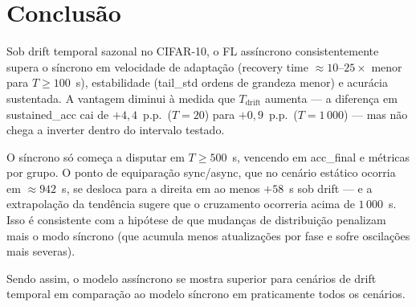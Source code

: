 \documentclass[12pt, a4paper]{article}
\begin{document}
\section{Conclusão}

Sob drift temporal sazonal no CIFAR-10, o FL assíncrono consistentemente
supera o síncrono em velocidade de adaptação (recovery time $\approx
10$--$25{\times}$ menor para $T \geq 100$~s), estabilidade (tail\_std ordens
de grandeza menor) e acurácia sustentada. A vantagem diminui à medida que
$T_{\text{drift}}$ aumenta --- a diferença em sustained\_acc cai de
$+4{,}4$~p.p.\ ($T = 20$) para $+0{,}9$~p.p.\ ($T = 1\,000$) --- mas não
chega a inverter dentro do intervalo testado.

O síncrono só começa a disputar em $T \geq 500$~s, vencendo em acc\_final e
métricas por grupo. O ponto de equiparação sync/async, que no cenário estático
ocorria em $\approx 942$~s, se desloca para a direita em ao menos $+58$~s
sob drift --- e a extrapolação da tendência sugere que o cruzamento ocorreria
acima de $1\,000$~s. Isso é consistente com a hipótese de que
mudanças de distribuição penalizam mais o modo síncrono (que acumula menos
atualizações por fase e sofre oscilações mais severas).

Sendo assim, o modelo assíncrono se mostra superior para cenários de drift temporal em comparação ao modelo síncrono em praticamente todos os cenários.
\end{document}
